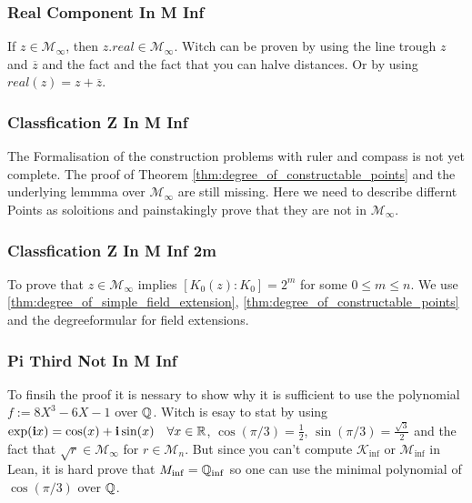 \documentclass{../Proof_layout_PDF/TemplateExercise}
\begin{document}
\subsubsection*{Real Component In M Inf}
If $z \in \mathcal{M}_{\infty}$, then $z.real \in \mathcal{M}_{\infty}$.
Witch can be proven by using the line trough $z$ and $\overline{z}$ and the fact and the fact that you can halve distances. Or by using $real(z)= z+ \overline{z}$.
\subsubsection*{Classfication Z In M Inf}
The Formalisation of the construction problems with ruler and compass is not yet complete.
The proof of Theorem \ref{thm:degree_of_constructable_points} and the underlying lemmma over $\mathcal{M}_{\infty}$ are still missing.
Here we need to describe differnt Points as soloitions and painstakingly prove that they are not in $\mathcal{M}_{\infty}$.
\subsubsection*{Classfication Z In M Inf 2m}
To prove that $z \in \mathcal{M}_{\infty}$ implies $[K_0(z):K_0] = 2^m$ for some $0 \le m \le n$. We use \ref{thm:degree_of_simple_field_extension}, \ref{thm:degree_of_constructable_points} and the degreeformular for field extensions.
\subsubsection*{Pi Third Not In M Inf}
To finsih the proof it is nessary to show why it is sufficient to use the polynomial $f := 8 X^3 - 6 X - 1$ over $\mathbb{Q}$. Witch is esay to stat by using $\exp(\textbf{i}x) = \cos(x) + \textbf{i} \sin(x) \quad \forall x \in \mathbb{R}$, $\cos(\pi/3) = \frac{1}{2}$, $\sin(\pi/3) = \frac{\sqrt{3}}{2}$ and the fact that $\sqrt{r} \in \mathcal{M}_{\infty}$ for $r \in \mathcal{M}_n$.
But since you can't compute $\mathcal K_{\inf}$ or $\mathcal M_{\inf}$ in Lean, it is hard prove that $M_{\inf}= \mathbb{Q}_{\inf}$ so one can use the minimal polynomial of $\cos(\pi/3)$ over $\mathbb{Q}$.
\end{document}
